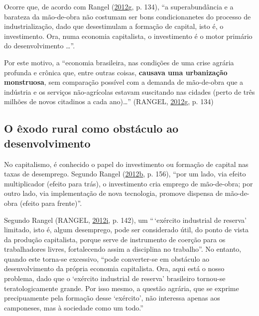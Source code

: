 \documentclass[a4paper, 12pt]{article}
\begin{document}
Ocorre que, de acordo com Rangel
(\protect\hyperlink{ref-rangel1986b}{2012}\protect\hyperlink{ref-rangel1986b}{g},
p. 134), ``a superabundância e a barateza da mão-de-obra não costumam
ser bons condicionanetes do processo de industrialização, dado que
desestimulam a formação de capital, isto é, o investimento. Ora, numa
economia capitalista, o investimento é o motor primário do
desenvolvimento \ldots{}''.

Por este motivo, a ``economia brasileira, nas condições de uma crise
agrária profunda e crônica que, entre outras coisas, \textbf{causava uma
urbanização monstruosa}, sem comparação possível com a demanda de
mão-de-obra que a indústria e os serviços não-agrícolas estavam
suscitando nas cidades (perto de três milhões de novos citadinos a cada
ano)\ldots{}'' (RANGEL,
\protect\hyperlink{ref-rangel1986b}{2012}\protect\hyperlink{ref-rangel1986b}{g},
p. 134)

\hypertarget{o-exodo-rural-como-obstaculo-ao-desenvolvimento}{%
\subsection{O êxodo rural como obstáculo ao
desenvolvimento}\label{o-exodo-rural-como-obstaculo-ao-desenvolvimento}}

No capitalismo, é conhecido o papel do investimento ou formação de
capital nas taxas de desemprego. Segundo Rangel
(\protect\hyperlink{ref-rangel1988}{2012}\protect\hyperlink{ref-rangel1988}{b},
p. 156), ``por um lado, via efeito multiplicador (efeito para trás), o
investimento cria emprego de mão-de-obra; por outro lado, via
implementação de nova tecnologia, promove dispensa de mão-de-obra
(efeito para frente)''.

Segundo Rangel (RANGEL,
\protect\hyperlink{ref-rangel1986c}{2012}\protect\hyperlink{ref-rangel1986c}{i},
p. 142), um ``\,`exército industrial de reserva' limitado, isto é, algum
desemprego, pode ser considerado útil, do ponto de vista da produção
capitalista, porque serve de instrumento de coerção para os
trabalhadores livres, fortalecendo assim a disciplina no trabalho''. No
entanto, quando este torna-se excessivo, ``pode converter-se em
obstáculo ao desenvolvimento da própria economia capitalista. Ora, aqui
está o nosso problema, dado que o `exército industrial de reserva'
brasileiro tornou-se teratologicamente grande. Por isso mesmo, a questão
agrária, que se exprime precipuamente pela formação desse `exército',
não interessa apenas aos camponeses, mas à sociedade como um todo.''
\end{document}
